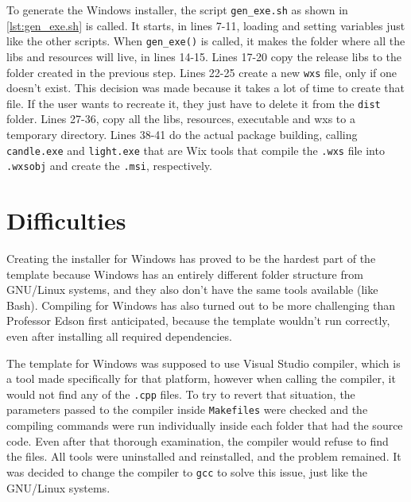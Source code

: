 

To generate the Windows installer, the script \texttt{gen\_exe.sh} as shown in \ref{lst:gen_exe.sh} is called. It starts, in lines 7-11, loading and setting variables just like the other scripts. When \texttt{gen\_exe()} is called, it makes the folder where all the libs and resources will live, in lines 14-15. Lines 17-20 copy the release libs to the folder created in the previous step. Lines 22-25 create a new \texttt{wxs} file, only if one doesn't exist. This decision was made because it takes a lot of time to create that file. If the user wants to recreate it, they just have to delete it from the \texttt{dist} folder. Lines 27-36, copy all the libs, resources, executable and wxs to a temporary directory. Lines 38-41 do the actual package building, calling \texttt{candle.exe} and \texttt{light.exe} that are Wix tools that compile the \texttt{.wxs} file into \texttt{.wxsobj} and create the \texttt{.msi}, respectively.




\section{Difficulties}
\label{sec:difficulties}

Creating the installer for Windows has proved to be the hardest part of the template because Windows has an entirely different folder structure from GNU/Linux systems, and they also don't have the same tools available (like Bash). Compiling for Windows has also turned out to be more challenging than Professor Edson first anticipated, because the template wouldn't run correctly, even after installing all required dependencies.

The template for Windows was supposed to use Visual Studio compiler, which is a tool made specifically for that platform, however when calling the compiler, it would not find any of the \texttt{.cpp} files. To try to revert that situation, the parameters passed to the compiler inside \texttt{Makefiles} were checked and the compiling commands were run individually inside each folder that had the source code. Even after that thorough examination, the compiler would refuse to find the files. All tools were uninstalled and reinstalled, and the problem remained. It was decided to change the compiler to \texttt{gcc} to solve this issue, just like the GNU/Linux systems.

